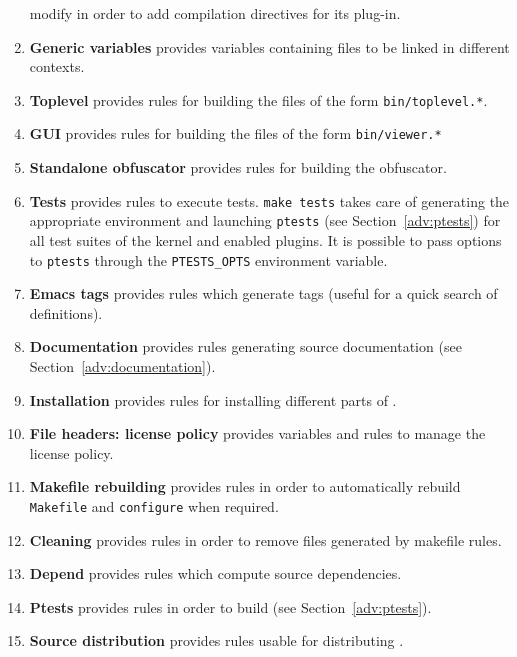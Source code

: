 \begin{enumerate}
\begin{important}
    modify in order to add compilation directives for its plug-in.
  \end{important}
\item \textbf{Generic variables} provides variables containing files to be
  linked in different contexts.
\item \textbf{Toplevel} provides rules for building the files of the form
  \texttt{bin/toplevel.*}.
\item \textbf{GUI} provides rules for building the files of the form
  \texttt{bin/viewer.*}
\item \textbf{Standalone obfuscator} provides rules for building the \framac
  obfuscator.
\item\label{make:sec:tests} 
  \textbf{Tests} provides rules to execute tests.
  \verb|make tests| takes care of generating the appropriate environment and 
  launching \texttt{ptests} (see Section~\ref{adv:ptests}) for all
  test suites of the kernel and enabled plugins. It is possible
  to pass options to \texttt{ptests} through the 
  \texttt{PTESTS\_OPTS} environment variable.
\item \textbf{Emacs tags} provides rules which generate \emacs tags (useful for
  a quick search of \caml definitions).
\item \textbf{Documentation} provides rules generating \framac source
  documentation (see Section~\ref{adv:documentation}).
\item \textbf{Installation} provides rules for installing different parts of
  \framac.
\item \textbf{File headers: license policy} provides variables and rules to
  manage the \framac license policy.
\item \textbf{Makefile rebuilding} provides rules in order to automatically
  rebuild \texttt{Makefile} and \texttt{configure} when required.
\item \textbf{Cleaning} provides rules in order to remove files generated by
  makefile rules.
\item \textbf{Depend} provides rules which compute \framac source dependencies.
\item \textbf{Ptests} provides rules in order to build \ptests (see
  Section~\ref{adv:ptests}).
\item \textbf{Source distribution} provides rules usable for distributing
  \framac.
\end{enumerate}

